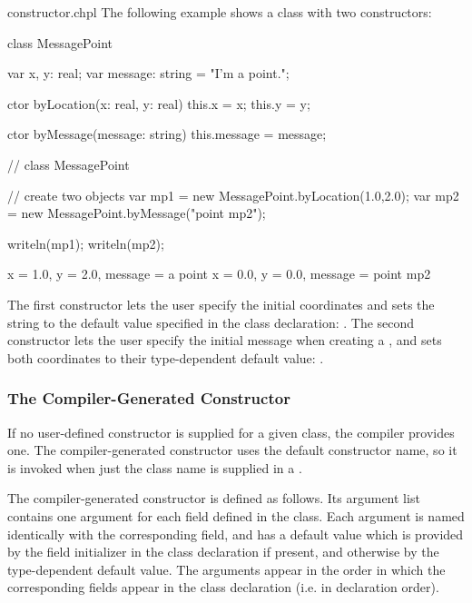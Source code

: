 \begin{chapelexample}{constructor.chpl}
The following example shows a class with two constructors:
\begin{chapel}
class MessagePoint {
  var x, y: real;
  var message: string = "I'm a point.";

  ctor byLocation(x: real, y: real) 
  { this.x = x; this.y = y; }

  ctor byMessage(message: string) 
  { this.message = message; }
}  // class MessagePoint

// create two objects
var mp1 = new MessagePoint.byLocation(1.0,2.0);
var mp2 = new MessagePoint.byMessage("point mp2");
\end{chapel}
\begin{chapelpost}
writeln(mp1);
writeln(mp2);
\end{chapelpost}
\begin{chapeloutput}
{x = 1.0, y = 2.0, message = a point}
{x = 0.0, y = 0.0, message = point mp2}
\end{chapeloutput}
The first constructor lets the user specify the initial coordinates
and sets the string to the default value specified in the class
declaration: .  The second constructor lets the user specify the initial message
when creating a , and sets both coordinates to their
type-dependent default value: .
\end{chapelexample}

\subsubsection{The Compiler-Generated Constructor}
\label{The_Compiler_Generated_Constructor}

If no user-defined constructor is supplied for a given class, the compiler
provides one.  The compiler-generated constructor uses the default constructor
name, so it is invoked when just the class name is supplied in
a .  

The compiler-generated constructor is defined as follows.  Its argument list
contains one argument for each field defined in the class.  Each argument is
named identically with the corresponding field, and has a default value
which is provided by the field initializer in the class declaration if present,
and otherwise by the type-dependent default value.
The arguments appear in the order in which the corresponding fields appear in the
class declaration (i.e. in declaration order).

